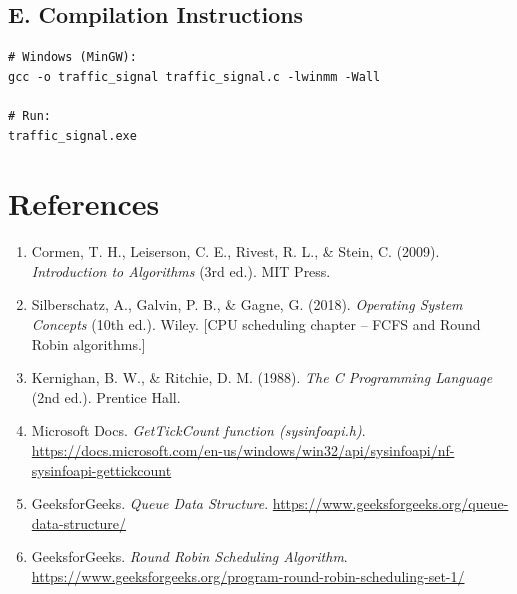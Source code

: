 \documentclass[12pt,a4paper]{article}
\begin{document}
\subsection{E. Compilation Instructions}

\begin{verbatim}
# Windows (MinGW):
gcc -o traffic_signal traffic_signal.c -lwinmm -Wall

# Run:
traffic_signal.exe
\end{verbatim}

\newpage

\section*{References}

\begin{enumerate}
    \item Cormen, T. H., Leiserson, C. E., Rivest, R. L., \& Stein, C. (2009). \textit{Introduction to Algorithms} (3rd ed.). MIT Press.
    \item Silberschatz, A., Galvin, P. B., \& Gagne, G. (2018). \textit{Operating System Concepts} (10th ed.). Wiley. [CPU scheduling chapter -- FCFS and Round Robin algorithms.]
    \item Kernighan, B. W., \& Ritchie, D. M. (1988). \textit{The C Programming Language} (2nd ed.). Prentice Hall.
    \item Microsoft Docs. \textit{GetTickCount function (sysinfoapi.h)}. \url{https://docs.microsoft.com/en-us/windows/win32/api/sysinfoapi/nf-sysinfoapi-gettickcount}
    \item GeeksforGeeks. \textit{Queue Data Structure}. \url{https://www.geeksforgeeks.org/queue-data-structure/}
    \item GeeksforGeeks. \textit{Round Robin Scheduling Algorithm}. \url{https://www.geeksforgeeks.org/program-round-robin-scheduling-set-1/}
\end{enumerate}
\end{document}
